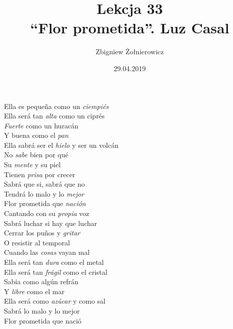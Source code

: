\documentclass[a4paper]{article}
\begin{document}
    \title{
        {\huge Lekcja 33} \\
        {\large ``Flor prometida''. Luz Casal}
    }
    \author{Zbigniew Żołnierowicz}
    \date{29.04.2019}
    \maketitle
    Ella es peque\~na como un \emph{ciempi\'es} \\
    Ella ser\'a tan \emph{alta} como un cipr\'es \\
    \emph{Fuerte} como un hurac\'an \\
    Y buena como el \emph{pan} \\
    Ella sabr\'a ser el \emph{hielo} y ser un volc\'an \\
    No \emph{sabe} bien por qu\'e \\
    Su \emph{mente} y su piel \\
    Tienen \emph{prisa} por crecer \\
    Sabr\'a que si, sabr\'a que no \\
    Tendr\'a lo malo y lo \emph{mejor} \\
    Flor prometida que \emph{nación} \\
    Cantando con su \emph{propia} voz \\
    Sabr\'a luchar si hay que luchar \\
    Cerrar los pu\~nos y \emph{gritar} \\
    O resistir al temporal \\
    Cuando las \emph{cosas} vayan mal \\
    Ella ser\'a tan \emph{dura} como el metal \\
    Ella ser\'a tan \emph{fr\'agil} como el cristal \\
    Sabia como alg\'un refr\'an \\
    Y \emph{libre} como el mar \\
    Ella ser\'a como \emph{az\'ucar} y como sal \\
    Sabr\'a lo malo y lo mejor \\
    Flor prometida que nació
\end{document}
